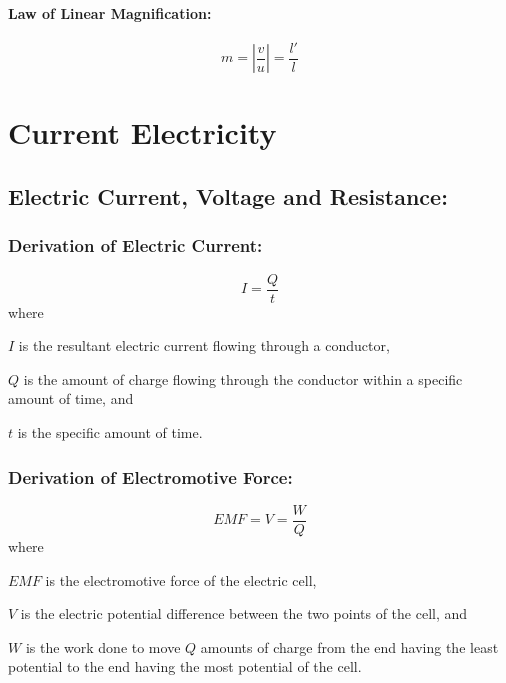 \documentclass[a4paper]{report}
\begin{document}
        \subsubsection{Law of Linear Magnification: }
            \begin{equation}
                m = |\frac{v}{u}| = \frac{l'}{l}
            \end{equation}

\addtocounter{chapter}{2}


\chapter{Current Electricity}
    \section{Electric Current, Voltage and Resistance:}
        \subsection{Derivation of Electric Current:}
            \begin{equation}
                I = \frac{Q}{t}
            \end{equation}
            where
            \begin{description}
                \item $I$ is the resultant electric current flowing through a conductor,
                \item $Q$ is the amount of charge flowing through the conductor within a specific amount of time, and
                \item $t$ is the specific amount of time. 
            \end{description}
        \subsection{Derivation of Electromotive Force:}
            \begin{equation}
                EMF = V = \frac{W}{Q}
            \end{equation}
            where
            \begin{description}
                \item $EMF$ is the electromotive force of the electric cell,
                \item $V$ is the electric potential difference between the two points of the cell, and
                \item $W$ is the work done to move $Q$ amounts of charge from the end having the least potential to the end having the most potential of the cell. 
            \end{description}
\end{document}
